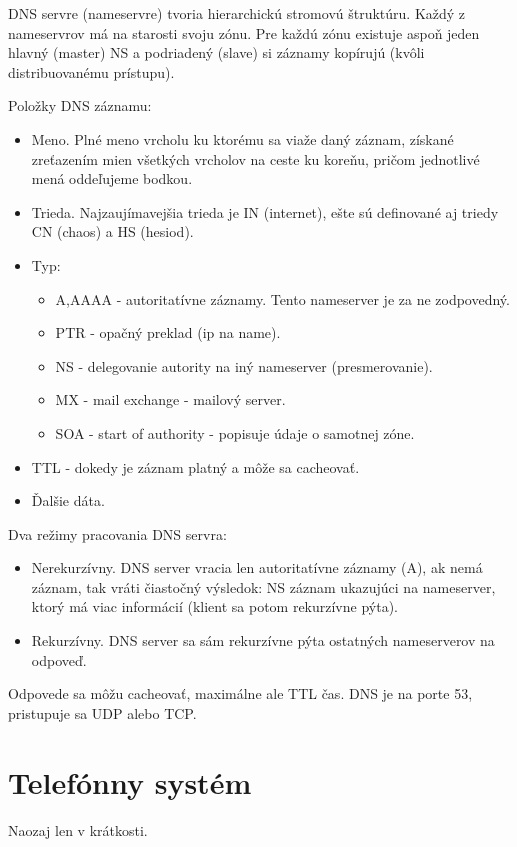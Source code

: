 \documentclass[10pt,a4paper]{article}
\begin{document}
DNS servre (nameservre) tvoria hierarchickú stromovú štruktúru. Každý z nameservrov má na starosti svoju zónu. Pre každú zónu existuje aspoň jeden hlavný (master) NS a podriadený (slave) si záznamy kopírujú (kvôli distribuovanému prístupu). 

Položky DNS záznamu: 
\begin{itemize}
\item Meno. Plné meno vrcholu ku ktorému sa viaže daný záznam, získané zreťazením mien všetkých vrcholov na ceste ku koreňu, pričom jednotlivé mená oddeľujeme bodkou.
\item Trieda. Najzaujímavejšia trieda je IN (internet), ešte sú definované aj triedy CN (chaos) a HS (hesiod). 
\item Typ:
\begin{itemize}
\item A,AAAA - autoritatívne záznamy. Tento nameserver je za ne zodpovedný. 
\item PTR - opačný preklad (ip na name). 
\item NS - delegovanie autority na iný nameserver (presmerovanie). 
\item MX - mail exchange - mailový server. 
\item SOA - start of authority - popisuje údaje o samotnej zóne. 
\end{itemize}
\item TTL - dokedy je záznam platný a môže sa cacheovať. 
\item Ďalšie dáta. 
\end{itemize}

Dva režimy pracovania DNS servra: 
\begin{itemize}
\item Nerekurzívny. DNS server vracia len autoritatívne záznamy (A), ak nemá záznam, tak vráti čiastočný výsledok: NS záznam ukazujúci na nameserver, ktorý má viac informácií (klient sa potom rekurzívne pýta). 
\item Rekurzívny. DNS server sa sám rekurzívne pýta ostatných nameserverov na odpoveď.
\end{itemize}

Odpovede sa môžu cacheovať, maximálne ale TTL čas. DNS je na porte 53, pristupuje sa UDP alebo TCP. 

\section{Telefónny systém}  
Naozaj len v krátkosti. 
  
\end{document}

